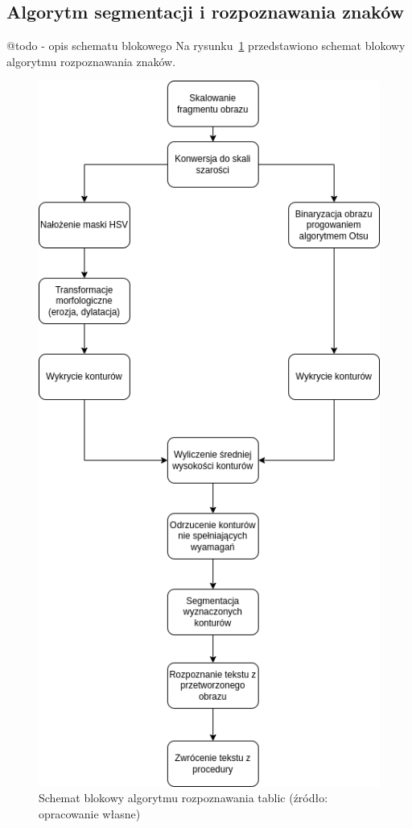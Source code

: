 \subsection{Algorytm segmentacji i rozpoznawania znaków}
@todo - opis schematu blokowego
Na rysunku~\ref{fig:characters_alg} przedstawiono schemat blokowy algorytmu rozpoznawania znaków.
\begin{figure}[!ht]
    \centering
    \includegraphics[scale=0.4]{Pictures/characters_alg}
    \caption{Schemat blokowy algorytmu rozpoznawania tablic (źródło: opracowanie własne)}
    \label{fig:characters_alg}
\end{figure}

